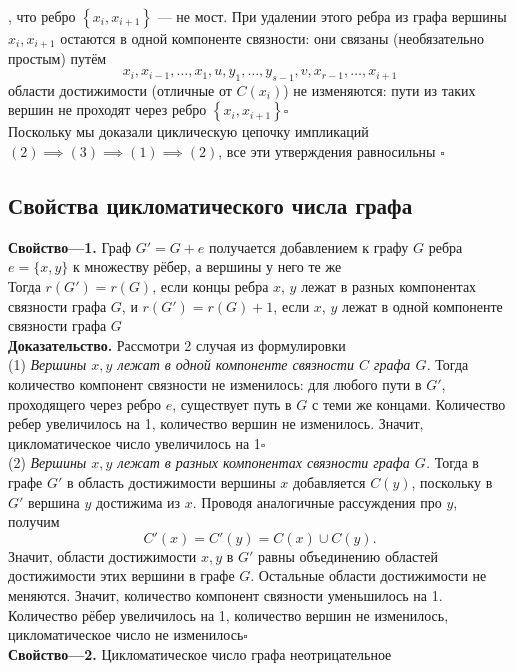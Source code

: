 \documentclass[a4paper]{article}
\begin{document}
, что ребро $\left\{x_i, x_{i+1}\right\}$ — не мост. При удалении этого ребра из графа вершины $x_i, x_{i+1}$ остаются в одной компоненте связности: они связаны (необязательно простым) путём
$$x_i, x_{i-1}, \ldots, x_1, u, y_1, \ldots, y_{s-1}, v, x_{r-1}, \ldots, x_{i+1}$$
 области достижимости (отличные от $C\left(x_i\right)$) не изменяются: пути из таких вершин не проходят через ребро $\left\{x_i, x_{i+1}\right\}$\hfill$\square$\\[2mm]
\indent Поскольку мы доказали циклическую цепочку импликаций $(2)\implies(3)\implies(1)\implies(2)$, все эти утверждения равносильны \hfill$\square$


\subsection{Свойства цикломатического числа графа}
\textbf{Свойство—1.} Граф $G'=G+e$ получается добавлением к графу $G$ ребра $e=\{x,y\}$ к множеству рёбер, а вершины у него те же\\
\indent Тогда $r(G')=r(G)$, если концы ребра $x$, $y$ лежат в разных компонентах связности графа $G$, и $r(G')=r(G)+1$, если $x$, $y$ лежат в одной компоненте связности графа $G$\\[2mm]
\indent\textbf{Доказательство.} Рассмотри 2 случая из формулировки\\[2mm]
\indent (1) \textit{Вершины $x,y$ лежат в одной компоненте связности $C$ графа $G$.} Тогда количество компонент связности не изменилось: для любого пути в $G'$, проходящего через ребро $e$, существует путь в $G$ с теми же концами. Количество ребер увеличилось на 1, количество вершин не изменилось. Значит, цикломатическое число увеличилось на 1\hfill$\square$\\[2mm]
\indent (2) \textit{Вершины $x,y$ лежат в разных компонентах связности графа $G$.} Тогда в графе $G'$ в область достижимости вершины $x$ добавляется $C(y)$, поскольку в $G'$ вершина $y$ достижима из $x$. Проводя аналогичные рассуждения про $y$, получим $$C'(x)=C'(y)=C(x)\cup C(y).$$
Значит, области достижимости $x,y$ в $G'$ равны объединению областей достижимости этих вершини в графе $G$. Остальные области достижимости не меняются. Значит, количество компонент связности уменьшилось на 1. Количество рёбер увеличилось на 1, количество вершин не изменилось, цикломатическое число не изменилось\hfill$\square$\\[3mm]
\indent\textbf{Свойство—2.} Цикломатическое число графа неотрицательное\\[2mm]
\end{document}
